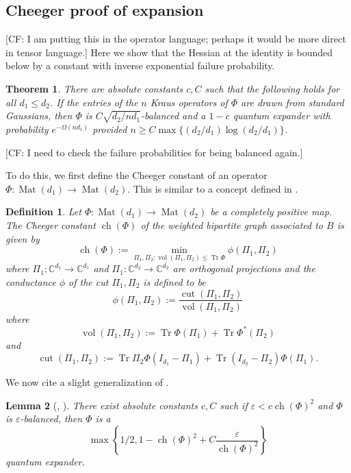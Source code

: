 \documentclass{article}
\newtheorem{theorem}{Theorem}
\newtheorem{lemma}[theorem]{Lemma}
\newtheorem{definition}{Definition}
\newcommand{\C}{{\mathbb{C}}}
\newcommand{\mat}{\operatorname{Mat}}
\newcommand{\ch}{\operatorname{ch}}
\newcommand{\cut}{\operatorname{cut}}
\newcommand{\vol}{\operatorname{vol}}
\newcommand\eps{\varepsilon}
\newcommand\tr{\operatorname{Tr}}
\newcommand{\CF}[1]{{\color{purple}[CF: #1]}}
\begin{document}
\subsection{Cheeger proof of expansion}
\CF{I am putting this in the operator language; perhaps it would be more direct in tensor language.}
Here we show that the Hessian at the identity is bounded below by a constant with inverse exponential failure probability. 
\begin{theorem}\label{thm:operator-cheeger}
There are absolute constants $c, C$ such that the following holds for all $d_1 \leq d_2$. If the entries of the $n$ Kraus operators of $\Phi$ are drawn from standard Gaussians, then $\Phi$ is $C\sqrt{d_2/n d_1}$-balanced and a $1 - c$ quantum expander with probability $e^{ - \Omega( nd_1)}$ provided $n \geq C\max\{(d_2/d_1) \log (d_2/d_1)\}$. 
\end{theorem}
\CF{I need to check the failure probabilities for being balanced again.}

To do this, we first define the Cheeger constant of an operator $\Phi:\mat(d_1) \to \mat(d_2)$. This is similar to a concept defined in \cite{H07}.
\begin{definition}
Let $\Phi : \mat(d_1) \to \mat(d_2)$ be a completely positive map. The Cheeger constant $\ch(\Phi)$ of the weighted bipartite graph associated to $B$ is given by 
$$\ch(\Phi):=\min_{\Pi_1, \Pi_2: \vol(\Pi_1, \Pi_2) \leq \tr \Phi} \phi(\Pi_1,\Pi_2)$$
where $\Pi_1: \C^{d_1} \to \C^{d_1}$ and $\Pi_1: \C^{d_2} \to \C^{d_2}$ are orthogonal projections and the \emph{conductance} $\phi$ of the cut $\Pi_1, \Pi_2$ is defined to be
$$\phi(\Pi_1,\Pi_2) := \frac{\cut(\Pi_1, \Pi_2)}{\vol(\Pi_1,\Pi_2)}$$
where 
$$ \vol(\Pi_1,\Pi_2):= 
\tr \Phi(\Pi_1) + \tr \Phi^*(\Pi_2)$$ 
and $$ \cut(\Pi_1, \Pi_2):= \tr \Pi_2 \Phi(I_{d_1} - \Pi_1) + \tr (I_{d_2} - \Pi_2) \Phi(\Pi_1).$$
\end{definition}

We now cite a slight generalization of \cite{FM20}. 

\begin{lemma} [\cite{FM20}, \cite{KLR19}]\label{lem:op-cheeger} There exist absolute constants $c, C$ such if $\eps < c \ch(\Phi)^2$ and $\Phi$ is $\eps$-balanced, then $\Phi$ is a 
$$ \max\left\{1/2, 1 -  \ch(\Phi)^2 + C \frac{\eps}{\ch(\Phi)^2} \right\}$$
quantum expander.
\end{lemma}
\end{document}
